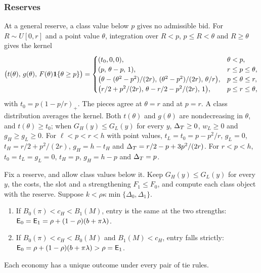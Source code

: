 \subsubsection*{Reserves}

At a general reserve, a class value below \(p\) gives no admissible bid. For \(R\sim U[0,r]\) and a point value \(\theta\),
integration over \(R<p\), \(p\le R<\theta\) and \(R\ge\theta\) gives the kernel
\begin{equation}\label{eq:a7-kernel}
\bigl(t(\theta),\,g(\theta),\,F(\theta)\mathbf{1}\{\theta\ge p\}\bigr)=
\begin{cases}
(t_0,0,0),&\theta<p,\\
(p,\,\theta-p,\,1),&r\le p\le\theta,\\
\bigl(\theta-(\theta^2-p^2)/(2r),\,(\theta^2-p^2)/(2r),\,\theta/r\bigr),&p\le\theta\le r,\\
\bigl(r/2+p^2/(2r),\,\theta-r/2-p^2/(2r),\,1\bigr),&p\le r\le\theta,
\end{cases}
\end{equation}
with \(t_0=p(1-p/r)_+\). The pieces agree at \(\theta=r\) and at \(p=r\). A class distribution averages the kernel. Both
\(t(\theta)\) and \(g(\theta)\) are nondecreasing in \(\theta\), and \(t(\theta)\ge t_0\); when \(G_H(y)\le G_L(y)\) for every \(y\), \(\Delta_T\ge0\), \(w_L\ge0\) and
\(g_H\ge g_L\ge0\). For \(\ell<p<r<h\) with point values, \(t_L=t_0=p-p^2/r\), \(g_L=0\), \(t_H=r/2+p^2/(2r)\),
\(g_H=h-t_H\) and \(\Delta_T=r/2-p+3p^2/(2r)\). For \(r<p<h\), \(t_0=t_L=g_L=0\), \(t_H=p\), \(g_H=h-p\) and \(\Delta_T=p\).

\begin{proposition}[Reserves]\label{prop:reserves}
Fix a reserve, and allow class values below it. Keep \(G_H(y)\le G_L(y)\) for every \(y\), the costs, the slot and a strengthening
\(F_1\le F_0\), and compute each class object with the reserve. Suppose \(k<\rho\kappa\min\{\Delta_0,\Delta_1\}\).
\begin{enumerate}[label=(\alph*),leftmargin=2em]
\item If \(B_0(\pi)<c_H<B_1(M)\), entry is the same at the two strengths:
\(\mathsf{E}_0=\mathsf{E}_1=\rho+(1-\rho)(b+\pi\lambda)\).
\item If \(B_0(\pi)<c_H<B_0(M)\) and \(B_1(M)<c_H\), entry falls strictly:
\(\mathsf{E}_0=\rho+(1-\rho)(b+\pi\lambda)>\rho=\mathsf{E}_1\).
\end{enumerate}
Each economy has a unique outcome under every pair of tie rules.
\end{proposition}

